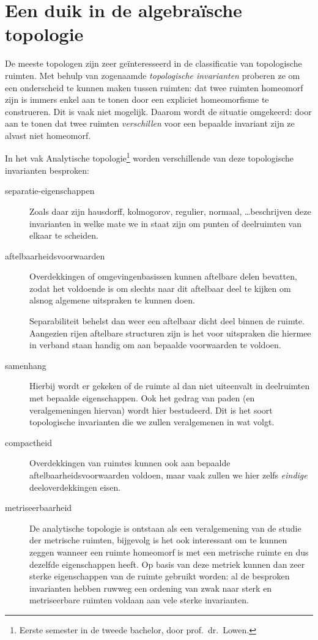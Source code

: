 \documentclass[a4paper,11pt,openany,oneside,article]{memoir}
\begin{document}
\section{Een duik in de algebra\"ische topologie}
De meeste topologen zijn zeer ge\"interesseerd in de classificatie van topologische ruimten. Met behulp van zogenaamde \emph{topologische invarianten} proberen ze om een onderscheid te kunnen maken tussen ruimten: dat twee ruimten homeomorf zijn is immers enkel aan te tonen door een expliciet homeomorfisme te construeren. Dit is vaak niet mogelijk. Daarom wordt de situatie omgekeerd: door aan te tonen dat twee ruimten \emph{verschillen} voor een bepaalde invariant zijn ze alvast niet homeomorf.

In het vak Analytische topologie\footnote{Eerste semester in de tweede bachelor, door prof.~dr.~Lowen.} worden verschillende van deze topologische invarianten besproken:
\begin{description}
  \item[separatie-eigenschappen] Zoals daar zijn hausdorff, kolmogorov, regulier, normaal, \ldots beschrijven deze invarianten in welke mate we in staat zijn om punten of deelruimten van elkaar te scheiden. 

  \item[aftelbaarheidsvoorwaarden] Overdekkingen of omgevingenbasissen kunnen aftelbare delen bevatten, zodat het voldoende is om slechts naar dit aftelbaar deel te kijken om alsnog algemene uitspraken te kunnen doen.
    
    Separabiliteit behelst dan weer een aftelbaar dicht deel binnen de ruimte. Aangezien rijen aftelbare structuren zijn is het voor uitspraken die hiermee in verband staan handig om aan bepaalde voorwaarden te voldoen.
    
  \item[samenhang] Hierbij wordt er gekeken of de ruimte al dan niet uiteenvalt in deelruimten met bepaalde eigenschappen. Ook het gedrag van paden (en veralgemeningen hiervan) wordt hier bestudeerd. Dit is het soort topologische invarianten die we zullen veralgemenen in wat volgt.

  \item[compactheid] Overdekkingen van ruimtes kunnen ook aan bepaalde aftelbaarheidsvoorwaarden voldoen, maar vaak zullen we hier zelfs \emph{eindige} deeloverdekkingen eisen. 

  \item[metriseerbaarheid] De analytische topologie is ontstaan als een veralgemening van de studie der metrische ruimten, bijgevolg is het ook interessant om te kunnen zeggen wanneer een ruimte homeomorf is met een metrische ruimte en dus dezelfde eigenschappen heeft. Op basis van deze metriek kunnen dan zeer sterke eigenschappen van de ruimte gebruikt worden: al de besproken invarianten hebben ruwweg een ordening van zwak naar sterk en metriseerbare ruimten voldaan aan vele sterke invarianten.
\end{description}
\end{document}

